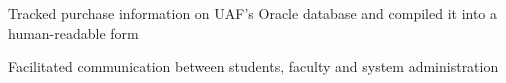 \begin{job}

  \begin{accomplishments}
    \item Tracked purchase information on UAF's Oracle database and compiled it into a human-readable form
    \item Facilitated communication between students, faculty and system
    administration
  \end{accomplishments}
\end{job}
